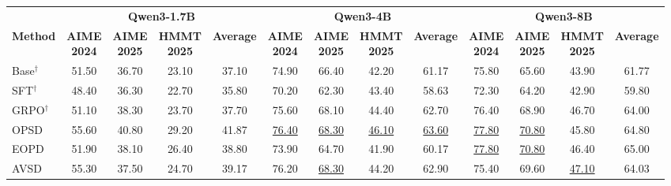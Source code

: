 \documentclass[letterpaper]{article} %
\newcommand{\secondscore}[1]{\cellcolor{ranksecond}\underline{#1}}
\newcommand{\thirdscore}[1]{\cellcolor{rankthird}#1}
\begin{document}
\label{subsec:main_results}

\begin{table}[t]
\centering
\small
\setlength{\tabcolsep}{1mm}
\begin{tabular}{
    @{}l
    cccc@{\hspace{0.6em}}
    cccc@{\hspace{0.6em}}
    cccc@{}
}
\toprule
& \multicolumn{4}{c}{\textbf{Qwen3-1.7B}}
& \multicolumn{4}{c}{\textbf{Qwen3-4B}}
& \multicolumn{4}{c}{\textbf{Qwen3-8B}} \\
\cmidrule(lr){2-5}
\cmidrule(lr){6-9}
\cmidrule(lr){10-13}
\textbf{Method}
& \shortstack{\textbf{AIME}\\\textbf{2024}}
& \shortstack{\textbf{AIME}\\\textbf{2025}}
& \shortstack{\textbf{HMMT}\\\textbf{2025}}
& \textbf{Average}
& \shortstack{\textbf{AIME}\\\textbf{2024}}
& \shortstack{\textbf{AIME}\\\textbf{2025}}
& \shortstack{\textbf{HMMT}\\\textbf{2025}}
& \textbf{Average}
& \shortstack{\textbf{AIME}\\\textbf{2024}}
& \shortstack{\textbf{AIME}\\\textbf{2025}}
& \shortstack{\textbf{HMMT}\\\textbf{2025}}
& \textbf{Average} \\
\midrule
Base$^{\dagger}$
& 51.50 & 36.70 & 23.10 & 37.10
& 74.90 & 66.40 & 42.20 & 61.17
& 75.80 & 65.60 & 43.90 & 61.77 \\
SFT$^{\dagger}$
& 48.40 & 36.30 & 22.70 & 35.80
& 70.20 & 62.30 & 43.40 & 58.63
& 72.30 & 64.20 & 42.90 & 59.80 \\
GRPO$^{\dagger}$
& 51.10 & 38.30 & 23.70 & 37.70
& 75.60 & \thirdscore{68.10} & \thirdscore{44.40} & 62.70
& \thirdscore{76.40} & 68.90 & \thirdscore{46.70} & 64.00 \\
\midrule
OPSD
& \thirdscore{55.60} & \thirdscore{40.80} & \thirdscore{29.20} & \thirdscore{41.87}
& \secondscore{76.40} & \secondscore{68.30} & \secondscore{46.10} & \secondscore{63.60}
& \secondscore{77.80} & \secondscore{70.80} & 45.80 & 64.80 \\
EOPD
& 51.90 & 38.10 & 26.40 & 38.80
& 73.90 & 64.70 & 41.90 & 60.17
& \secondscore{77.80} & \secondscore{70.80} & 46.40 & \thirdscore{65.00} \\
AVSD
& 55.30 & 37.50 & 24.70 & 39.17
& \thirdscore{76.20} & \secondscore{68.30} & 44.20 & \thirdscore{62.90}
& 75.40 & \thirdscore{69.60} & \secondscore{47.10} & 64.03 \\
			

\end{tabular}
\end{table}
\end{document}
